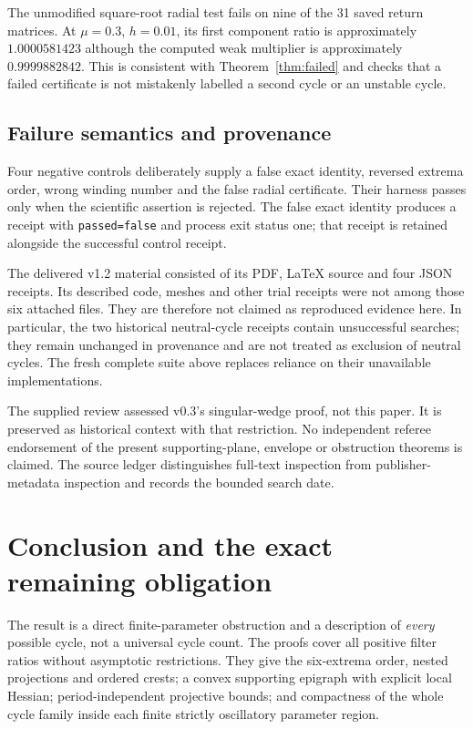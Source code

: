 \documentclass[11pt,a4paper]{article}
\numberwithin{equation}{section}
\theoremstyle{remark}\newtheorem{remark}[theorem]{Remark}
\begin{document}
The unmodified square-root radial test fails on nine of the 31 saved return matrices. At $\mu=0.3$, $h=0.01$, its first component ratio is approximately $1.0000581423$ although the computed weak multiplier is approximately $0.9999882842$. This is consistent with Theorem~\ref{thm:failed} and checks that a failed certificate is not mistakenly labelled a second cycle or an unstable cycle.

\subsection{Failure semantics and provenance}
Four negative controls deliberately supply a false exact identity, reversed extrema order, wrong winding number and the false radial certificate. Their harness passes only when the scientific assertion is rejected. The false exact identity produces a receipt with \texttt{passed=false} and process exit status one; that receipt is retained alongside the successful control receipt.

The delivered v1.2 material consisted of its PDF, LaTeX source and four JSON receipts. Its described code, meshes and other trial receipts were not among those six attached files. They are therefore not claimed as reproduced evidence here. In particular, the two historical neutral-cycle receipts contain unsuccessful searches; they remain unchanged in provenance and are not treated as exclusion of neutral cycles. The fresh complete suite above replaces reliance on their unavailable implementations.

The supplied review assessed v0.3's singular-wedge proof, not this paper. It is preserved as historical context with that restriction. No independent referee endorsement of the present supporting-plane, envelope or obstruction theorems is claimed. The source ledger distinguishes full-text inspection from publisher-metadata inspection and records the bounded search date.

\section{Conclusion and the exact remaining obligation}\label{sec:conclusion}
The result is a direct finite-parameter obstruction and a description of \emph{every} possible cycle, not a universal cycle count. The proofs cover all positive filter ratios without asymptotic restrictions. They give the six-extrema order, nested projections and ordered crests; a convex supporting epigraph with explicit local Hessian; period-independent projective bounds; and compactness of the whole cycle family inside each finite strictly oscillatory parameter region.
\end{document}
